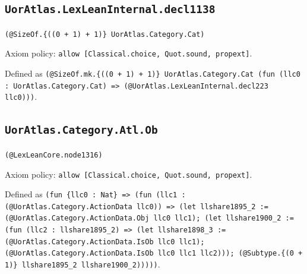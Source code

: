 \documentclass[11pt]{article}
\begin{document}
\subsection*{\texttt{UorAtlas.LexLeanInternal.decl1138}}
\noindent\texttt{(@SizeOf.\{((0 + 1) + 1)\} UorAtlas.Category.Cat)}\par
\noindent Axiom policy: \texttt{allow [Classical.choice, Quot.sound, propext]}.\par
\noindent Defined as \texttt{(@SizeOf.mk.\{((0 + 1) + 1)\} UorAtlas.Category.Cat (fun (llc0 : UorAtlas.Category.Cat) => (@UorAtlas.LexLeanInternal.decl223 llc0)))}.\par
\subsection*{\texttt{UorAtlas.Category.Atl.Ob}}
\noindent\texttt{(@LexLeanCore.node1316)}\par
\noindent Axiom policy: \texttt{allow [Classical.choice, Quot.sound, propext]}.\par
\noindent Defined as \texttt{(fun \{llc0 : Nat\} => (fun (llc1 : (@UorAtlas.Category.ActionData llc0)) => (let llshare1895\_2 := (@UorAtlas.Category.ActionData.Obj llc0 llc1); (let llshare1900\_2 := (fun (llc2 : llshare1895\_2) => (let llshare1898\_3 := (@UorAtlas.Category.ActionData.IsOb llc0 llc1); (@UorAtlas.Category.ActionData.IsOb llc0 llc1 llc2))); (@Subtype.\{(0 + 1)\} llshare1895\_2 llshare1900\_2)))))}.\par
\end{document}
